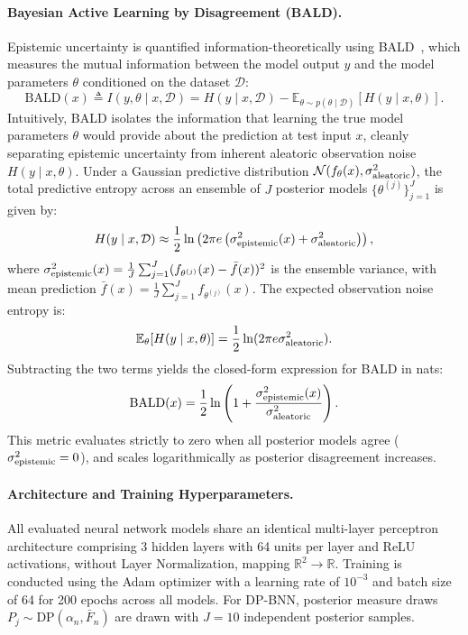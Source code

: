 \documentclass[10pt]{article}
\begin{document}
\paragraph{Bayesian Active Learning by Disagreement (BALD).} Epistemic uncertainty is quantified information-theoretically using BALD~\citep{houlsby2011bayesian}, which measures the mutual information between the model output $y$ and the model parameters $\theta$ conditioned on the dataset $\mathcal{D}$:
\begin{equation}\label{eq:bald-definition}
\text{BALD}(x) \triangleq I(y, \theta \mid x, \mathcal{D}) = H(y \mid x, \mathcal{D}) - \mathbb{E}_{\theta \sim p(\theta \mid \mathcal{D})}[H(y \mid x, \theta)].
\end{equation}
Intuitively, BALD isolates the information that learning the true model parameters $\theta$ would provide about the prediction at test input $x$, cleanly separating epistemic uncertainty from inherent aleatoric observation noise $H(y \mid x, \theta)$. Under a Gaussian predictive distribution $\mathcal{N}(f_\theta(x), \sigma^2_{\rm aleatoric})$, the total predictive entropy across an ensemble of $J$ posterior models $\{\theta^{(j)}\}_{j=1}^J$ is given by:
\begin{equation}
H(y \mid x, \mathcal{D}) \approx \frac{1}{2} \ln \left( 2\pi e \left( \sigma^2_{\rm epistemic}(x) + \sigma^2_{\rm aleatoric} \right) \right),
\end{equation}
where $\sigma^2_{\rm epistemic}(x) = \frac{1}{J}\sum_{j=1}^J (f_{\theta^{(j)}}(x) - \bar{f}(x))^2$ is the ensemble variance, with mean prediction $\bar{f}(x) = \frac{1}{J}\sum_{j=1}^J f_{\theta^{(j)}}(x)$. The expected observation noise entropy is:
\begin{equation}
\mathbb{E}_{\theta}[H(y \mid x, \theta)] = \frac{1}{2} \ln (2\pi e \sigma^2_{\rm aleatoric}).
\end{equation}
Subtracting the two terms yields the closed-form expression for BALD in nats:
\begin{equation}\label{eq:bald-gaussian}
\text{BALD}(x) = \frac{1}{2} \ln \left( 1 + \frac{\sigma^2_{\rm epistemic}(x)}{\sigma^2_{\rm aleatoric}} \right).
\end{equation}
This metric evaluates strictly to zero when all posterior models agree ($\sigma^2_{\rm epistemic} = 0$), and scales logarithmically as posterior disagreement increases.

\paragraph{Architecture and Training Hyperparameters.}
All evaluated neural network models share an identical multi-layer perceptron architecture comprising 3 hidden layers with 64 units per layer and ReLU activations, without Layer Normalization, mapping $\mathbb{R}^2 \to \mathbb{R}$. Training is conducted using the Adam optimizer with a learning rate of $10^{-3}$ and batch size of 64 for 200 epochs across all models. For DP-BNN, posterior measure draws $P_j \sim \mathrm{DP}(\alpha_n, \bar{F}_n)$ are drawn with $J=10$ independent posterior samples.
\end{document}

